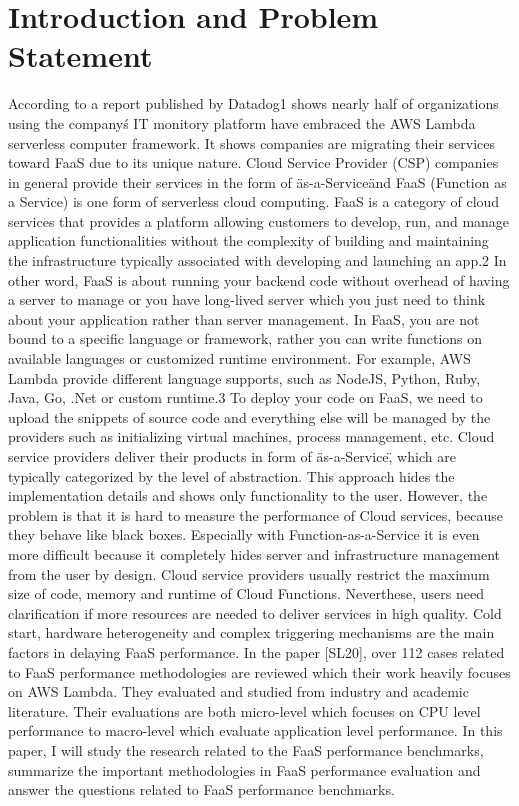 %
\section{Introduction and Problem Statement}
\label{sec:introduction-and-problem-statement}
According to a report published by Datadog1 shows nearly half of organizations using the company\'s IT monitory platform have embraced the AWS Lambda serverless computer framework. It shows companies are migrating their services toward FaaS due to its unique nature. Cloud Service Provider (CSP) companies in general provide their services in the form of \"as-a-Service\" and FaaS (Function as a Service) is one form of serverless cloud computing. FaaS is a category of cloud services that provides a platform allowing customers to develop, run, and manage application functionalities without the complexity of building and maintaining the infrastructure typically associated with developing and launching an app.2 In other word, FaaS is about running your backend code without overhead of having a server to manage or you have long-lived server which you just need to think about your application rather than server management. In FaaS, you are not bound to a specific language or framework, rather you can write functions on available languages or customized runtime environment. For example, AWS Lambda provide different language supports, such as NodeJS, Python, Ruby, Java, Go, .Net or custom runtime.3 To deploy your code on FaaS, we need to upload the snippets of source code and everything else will be managed by the providers such as initializing virtual machines, process management, etc.
Cloud service providers deliver their products in form of \"as-a-Service\", which are typically categorized by the level of abstraction. This approach hides the implementation details and shows only functionality to the user. However, the problem is that it is hard to measure the performance of Cloud services, because they behave like black boxes. Especially with Function-as-a-Service it is even more difficult because it completely hides server and infrastructure management from the user by design. Cloud service providers usually restrict the maximum size of code, memory and runtime of Cloud Functions. Neverthese, users need clarification if more resources are needed to deliver services in high quality. 
Cold start, hardware heterogeneity and complex triggering mechanisms are the main factors in delaying FaaS performance. In the paper [SL20], over 112 cases related to FaaS performance methodologies are reviewed which their work heavily focuses on AWS Lambda. They evaluated and studied from industry and academic literature. Their evaluations are both micro-level which focuses on CPU level performance to macro-level which evaluate application level performance. 
In this paper, I will study the research related to the FaaS performance benchmarks, summarize the important methodologies in FaaS performance evaluation and answer the questions related to FaaS performance benchmarks.

